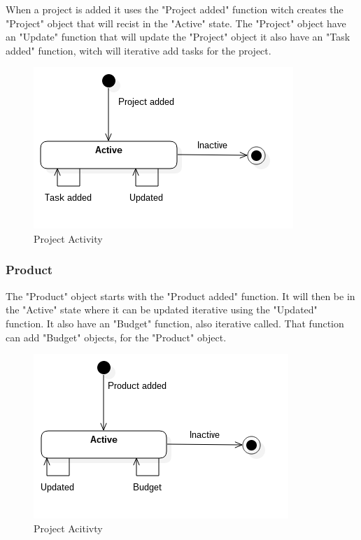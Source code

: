 When a project is added it uses the "Project added" function witch creates the "Project" object that will recist in the "Active" state. The "Project" object have an "Update" function that will update the "Project" object it also have an "Task added" function, witch will iterative add tasks for the project.

\begin{figure}[H]
    \centering
    \includegraphics[scale=0.6]{Images/ProblemDomain/projectActivityDiagram.png}
    \caption{Project Activity}
    \label{fig:projectActivityDiagram}
\end{figure}

\subsubsection*{Product}

The "Product" object starts with the "Product added" function. It will then be in the "Active" state where it can be updated iterative using the "Updated" function. It also have an "Budget" function, also iterative called. That function can add "Budget" objects, for the "Product" object.

\begin{figure}[H]
    \centering
    \includegraphics[scale=0.6]{Images/ProblemDomain/productActivityDiagram.png}
    \caption{Project Acitivty}
    \label{fig:productAcitvityDiagram}
\end{figure}

